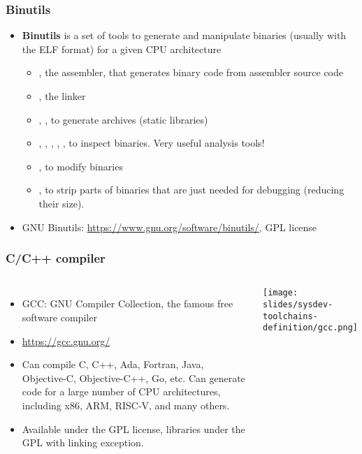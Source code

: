 \begin{frame}
  \frametitle{Binutils}
  \begin{itemize}
  \item {\bf Binutils} is a set of tools to generate and manipulate
    binaries (usually with the ELF format) for a given CPU architecture
    \begin{itemize}
    \item {}, the assembler, that generates binary code from
      assembler source code
    \item {}, the linker
    \item {}, , to generate  archives
     (static libraries)
    \item {}, , , ,
      , to inspect binaries. Very useful analysis tools!
    \item {}, to modify binaries
    \item {}, to strip parts of binaries that are just needed
      for debugging (reducing their size).
    \end{itemize}
  \item GNU Binutils: \url{https://www.gnu.org/software/binutils/}, GPL license
  \end{itemize}
\end{frame}

\begin{frame}
  \frametitle{C/C++ compiler}
  \begin{columns}
    \begin{itemize}
    \item GCC: GNU Compiler Collection, the famous free software compiler
    \item \url{https://gcc.gnu.org/}
    \item Can compile C, C++, Ada, Fortran, Java, Objective-C,
      Objective-C++, Go, etc. Can generate code for a large number of CPU
      architectures, including x86, ARM, RISC-V, and many others.
    \item Available under the GPL license, libraries under the GPL with
      linking exception.
    \end{itemize}
    \texttt{[image: slides/sysdev-toolchains-definition/gcc.png]}
  \end{columns}
\end{frame}

